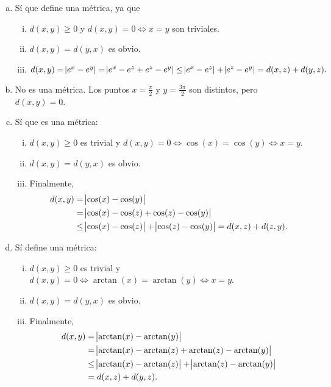 \begin{eje}
    \begin{enumerate}[(a)]
        \item Sí que define una m\'etrica, ya que
            \begin{enumerate}[i)]
                \item $d(x,y) \geq 0$ y $d(x,y) = 0 \iff x = y$ son triviales.
                \item $d(x,y) = d(y,x)$ es obvio.
                \item $d(x,y) = \abs{e^x - e^y} = \abs{e^x - e^z + e^z - e^y} \leq \abs{e^x - e^z} + \abs{e^z - e^y} = d(x,z) + d(y,z).$
            \end{enumerate}
        \item No es una m\'etrica. Los puntos $x = \frac{\pi}{2}$ y $y = \frac{3\pi}{2}$ son distintos, pero $d(x, y) = 0$.
        \item Sí que es una m\'etrica:
            \begin{enumerate}[i)]
                \item $d(x, y) \geq 0$ es trivial y $d(x,y) = 0 \iff \cos(x) = \cos(y) \iff x = y$.
                \item $d(x, y) = d(y,x)$ es obvio.
                \item Finalmente,
                    \begin{align*}
                        d(x, y) &= \abs{\cos(x) - \cos(y)} \\
                        &= \abs{\cos(x) - \cos(z) + \cos(z) - \cos(y)} \\
                        &\leq \abs{\cos(x) - \cos(z)} + \abs{\cos(z) - \cos(y)} = d(x,z) + d(z,y).
                    \end{align*}
            \end{enumerate}
        \item Sí define una m\'etrica:
            \begin{enumerate}[i)]
                \item $d(x, y) \geq 0$ es trivial y $d(x, y) = 0 \iff \arctan(x) = \arctan(y) \iff x = y$.
                \item $d(x, y) = d(y, x)$ es obvio.
                \item Finalmente,
                    \begin{align*}
                        d(x, y) &= \abs{\arctan(x) - \arctan(y)} \\
                        &= \abs{\arctan(x) - \arctan(z) + \arctan(z) - \arctan(y)} \\
                        &\leq \abs{\arctan(x) - \arctan(z)} + \abs{\arctan(z) - \arctan(y)} \\
                        &= d(x, z) + d(y,z).
                    \end{align*}
            \end{enumerate}
    \end{enumerate}


\end{eje}
